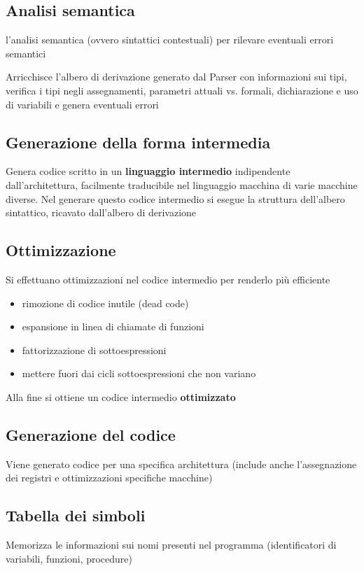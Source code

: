 \subsection{Analisi semantica}
l'analisi semantica  (ovvero sintattici contestuali) per rilevare eventuali errori semantici

Arricchisce l'albero di derivazione generato dal Parser con informazioni sui tipi, verifica i tipi negli assegnamenti, parametri attuali vs. formali, dichiarazione e uso di variabili e genera eventuali errori

\subsection{Generazione della forma intermedia}
Genera codice scritto in un \textbf{linguaggio intermedio} indipendente dall'architettura, facilmente traducibile nel linguaggio macchina di varie macchine diverse. Nel generare questo codice intermedio si esegue la struttura dell'albero sintattico, ricavato dall'albero di derivazione

\subsection{Ottimizzazione}
Si effettuano ottimizzazioni nel codice intermedio per renderlo più efficiente
\begin{itemize}
    \item rimozione di codice inutile (dead code) 
    \item espansione in linea di chiamate di funzioni
    \item fattorizzazione di sottoespressioni
    \item mettere fuori dai cicli sottoespressioni che non variano
\end{itemize}

Alla fine si ottiene un codice intermedio \textbf{ottimizzato}
\subsection{Generazione del codice}
Viene generato codice per una specifica architettura (include anche l'assegnazione dei registri e ottimizzazioni specifiche macchine)

\subsection{Tabella dei simboli}
Memorizza le informazioni sui nomi presenti nel programma (identificatori di variabili, funzioni, procedure)

